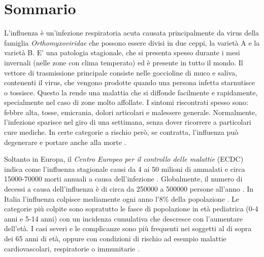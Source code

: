 \chapter*{Sommario} %
\label{sommario}


\bigskip
L'influenza è un'infezione respiratoria acuta causata principalmente da virus della famiglia \textit{Orthomyxoviridae} 
che possono essere divisi in due ceppi, la varietà A e la varietà B. E' una patologia stagionale,
che si presenta spesso durante i mesi invernali (nelle zone con clima temperato) ed è presente in tutto il mondo.
Il vettore di trasmissione principale consiste nelle goccioline di muco e saliva, contenenti il virus, che vengono prodotte
quando una persona infetta starnutisce o tossisce. Questo la rende una malattia che si diffonde facilmente e rapidamente, 
specialmente nel caso di zone molto affollate. I sintomi riscontrati spesso sono: febbre alta, tosse, emicrania, dolori 
articolari e malessere generale. Normalmente, l'infezione sparisce nel giro di una settimana, senza 
dover ricorrere a particolari cure mediche. In certe categorie a rischio però, se contratta, 
l'influenza può degenerare e portare anche alla morte \cite{whoinfluenza_keyfacts}. 
\bigskip

Soltanto in Europa, il \textit{Centro Europeo per il controllo delle malattie} (ECDC) indica come l'influenza
stagionale causi da 4 ai 50 milioni di ammalati e circa 15000-70000 morti annuali a causa dell'infezione \cite{ecdc_keyfacts}.
Globalmente, il numero di decessi a causa dell'influenza è di circa da 250000 a 500000 persone all'anno \cite{whoinfluenza_keyfacts}.  
In Italia l'influenza colpisce mediamente ogni anno l'8\% della popolazione \cite{epicentro}.
Le categorie più colpite sono sopratutto le fasce di popolazione in età pediatrica (0-4 anni e 5-14 anni)
con un incidenza cumulativa che descresce con l'aumentare dell'età. I casi severi e le complicanze
sono più frequenti nei soggetti al di sopra dei 65 anni di età, oppure con condizioni di rischio
ad esempio malattie cardiovascolari, respiratorie o immunitarie \cite{epicentro}.  
\bigskip

